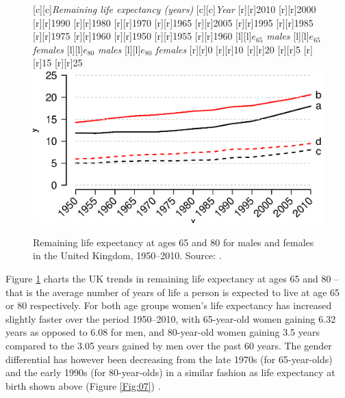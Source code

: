 \documentclass[11 pt, a4paper]{report}
\begin{document}
\begin{figure}[hbtp!]
[c][c]{\small{\emph{Remaining life expectancy (years)}}}
[c][c]{\small{\emph{Year}}}
[r][r]{\small{2010}}
[r][r]{\small{2000}}
[r][r]{\small{1990}}
[r][r]{\small{1980}}
[r][r]{\small{1970}}
[r][r]{\small{1965}}
[r][r]{\small{2005}}
[r][r]{\small{1995}}
[r][r]{\small{1985}}
[r][r]{\small{1975}}
[r][r]{\small{1960}}
[r][r]{\small{1950}}
[r][r]{\small{1955}}
[r][r]{\small{1960}}
[l][l]{$e_{65}$ \emph{males}}
[l][l]{$e_{65}$ \emph{females}}
[l][l]{$e_{80}$ \emph{males}}
[l][l]{$e_{80}$ \emph{females}}
[r][r]{\small{0}}
[r][r]{\small{10}}
[r][r]{\small{20}}
[r][r]{\small{5}}
[r][r]{\small{15}}
[r][r]{\small{25}}
\includegraphics[width=\textwidth]{../figures/Fig2.2.eps}
\caption{Remaining life expectancy at ages 65 and 80 for males and females in the United Kingdom, 1950--2010. Source:  \citet{HMD2015}.}
\label{Fig:08}
\end{figure}

Figure \ref{Fig:08} charts the UK trends in remaining life expectancy at ages 65 and 80 -- that is the average number of years of life a person is expected to live at age 65 or 80 respectively. For both age groups women's life expectancy has increased slightly faster over the period 1950--2010, with 65-year-old women gaining  6.32 years as opposed to 6.08 for men, and 80-year-old women gaining  3.5 years compared to the 3.05 years gained by men over the past 60 years. The gender differential has however been decreasing from the late 1970s (for 65-year-olds) and the early 1990s (for 80-year-olds) in a similar fashion as life expectancy at birth shown above (Figure \ref{Fig:07}) . 
\end{document}

